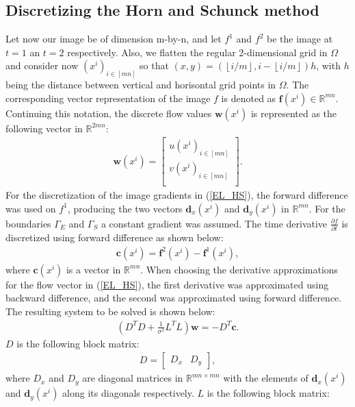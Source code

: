 \documentclass[10pt,a4paper]{article}
\begin{document}
\subsection{Discretizing the Horn and Schunck method}
\label{sec: disc}
Let now our image be of dimension m-by-n, and let $f^1$ and $f^2$ be the image at $t=1$ an $t=2$ respectively. Also, we flatten the regular 2-dimensional grid in $\Omega$ and consider now $(x^i)_ {i \in [mn]}$ so that $(x,y) = (\left \lfloor{i/m}\right \rfloor, i - \left \lfloor{i/m}\right \rfloor) h$, with $h$ being the distance between vertical and horisontal grid points in $\Omega$. The corresponding vector representation of the image $f$ is denoted as $\textbf{f}(x^i) \in \mathbb{R}^{mn}$. Continuing this notation, the discrete flow values $\textbf{w}(x^i)$ is represented as the following vector in $\mathbb{R}^{2mn}$:
\begin{align*}
     \textbf{w}(x^i)=\begin{bmatrix}
         u(x^i)_{i\in [mn]}  \\
         v(x^i)_{i \in [mn]} \\
        \end{bmatrix}.
\end{align*}
For the discretization of the image gradients in (\ref{EL_HS}), the forward difference was used on $f^1$, producing the two vectors $\textbf{d}_x(x^i)$ and $\textbf{d}_y(x^i)$ in $\mathbb{R}^{mn}$. For the boundaries $\Gamma_E$ and $\Gamma_S$ a constant gradient was assumed. The time derivative $\frac{\partial f}{\partial t}$ is discretized using forward difference as shown below:
\begin{align*}
\textbf{c}(x^i) = \textbf{f}^2(x^i) - \textbf{f}^1(x^i),
\end{align*} 
where $\textbf{c}(x^i)$ is a vector in $\mathbb{R}^{mn}$. When choosing the derivative approximations for the flow vector in (\ref{EL_HS}), the first derivative was approximated using backward difference, and the second was approximated using forward difference. The resulting system to be solved is shown below:
\begin{align}
(D^T D + \frac{1}{\sigma^2} L^TL) \textbf{w} = - D^T \textbf{c}.
\end{align}
$D$ is the following block matrix:
\begin{align*}
D = \left[
\begin{array}{c|c}
D_x & D_y
\end{array}
\right],
\end{align*}
where $D_x$ and $D_y$ are diagonal matrices in $\mathbb{R}^{mn \times mn}$ with the elements of $\textbf{d}_x(x^i)$ and $\textbf{d}_y(x^i)$ along its diagonals respectively. $L$ is the following block matrix:
\end{document}
